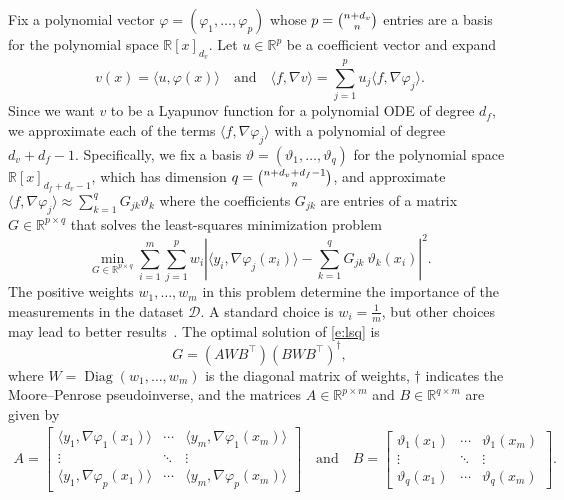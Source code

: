 \documentclass[11pt]{amsart}
\numberwithin{equation}{section}
\theoremstyle{plain}
\theoremstyle{definition}
\theoremstyle{remark}
\newcommand{\R}{\mathbb{R}}
\renewcommand{\vec}[1]{{#1}}
\newcommand{\mat}[1]{{#1}}
\newcommand{\ip}[2]{\langle #1, #2 \rangle}
\newcommand{\abs}[1]{\left\vert #1 \right\vert}
\DeclareMathOperator{\Diag}{Diag}
\begin{document}
Fix a polynomial vector $\varphi=(\varphi_1,\ldots,\varphi_p)$ whose $p=\smash{\binom{n+d_v}{n}}$ entries are a basis for the polynomial space $\R[\vec{x}]_{d_v}$. Let $\vec{u} \in \R^p$ be a coefficient vector and expand
\begin{equation*}
    v(x) = \ip{\vec{u}}{\varphi(\vec{x})}
    \quad\text{and}\quad
    \ip{\vec{f}}{\nabla v} = \sum_{j=1}^p u_j \ip{\vec{f}}{\nabla \varphi_j}.
\end{equation*}
Since we want $v$ to be a Lyapunov function for a polynomial ODE of degree $d_f$, we approximate each of the terms $\ip{\vec{f}}{\nabla \varphi_j}$ with a polynomial of degree $d_v+d_f-1$. Specifically, we fix a basis $\vartheta=(\vartheta_1,\ldots,\vartheta_q)$ for the polynomial space $\R[\vec{x}]_{d_f + d_v - 1}$, which has dimension $q=\smash{\binom{n+d_v+d_f-1}{n}}$, and approximate $\ip{\vec{f}}{\nabla \varphi_j} \approx \sum_{k=1}^q G_{jk} \vartheta_k$ where the coefficients $G_{jk}$ are entries of a matrix $\mat{G} \in \R^{p \times  q}$ that solves the least-squares minimization problem
\begin{equation}\label{e:lsq}
    \min_{\mat{G} \in \R^{p \times q}} \sum_{i=1}^{m} \sum_{j=1}^p  w_i \abs{ \ip{\vec{y}_i}{\nabla \varphi_j(\vec{x}_i)}  - \sum_{k=1}^q G_{jk} \ \vartheta_k(\vec{x}_i)}^2.
\end{equation}
The positive weights $w_1,\ldots, w_m$ in this problem determine the importance of the measurements in the dataset $\mathcal{D}$. A standard choice is $w_i=\frac1m$, but other choices may lead to better results~\cite{BramburgerColebrook2025}.
The optimal solution of \cref{e:lsq} is
\begin{equation*}
    \mat{G} = \left( \mat{A}\mat{W}\mat{B}^\top \right) \left( \mat{B}\mat{W}\mat{B}^\top\right)^{\dagger},
\end{equation*}
where $W = \Diag(w_1,\ldots,w_m)$ is the diagonal matrix of weights, $\dagger$ indicates the Moore--Penrose pseudoinverse, and the matrices $A\in \R^{p\times m}$ and $B\in\R^{q\times m}$ are given by
\begin{gather*}
    \mat{A} = \begin{bmatrix}
        \ip{\vec{y}_1}{\nabla \varphi_1(\vec{x}_1)} & \cdots & \ip{\vec{y}_m}{\nabla \varphi_1(\vec{x}_m)}\\
        \vdots & \ddots & \vdots \\
        \ip{\vec{y}_1}{\nabla \varphi_p(\vec{x}_1)} & \cdots & \ip{\vec{y}_m}{\nabla \varphi_p(\vec{x}_m)}
    \end{bmatrix}
    \quad\text{and}\quad
    \mat{B} =
    \begin{bmatrix}
        \vartheta_1(\vec{x}_1) & \cdots & \vartheta_1(\vec{x}_m)\\
        \vdots & \ddots & \vdots \\
        \vartheta_q(\vec{x}_1) & \cdots & \vartheta_q(\vec{x}_m)
    \end{bmatrix}.
\end{gather*}
\end{document}

